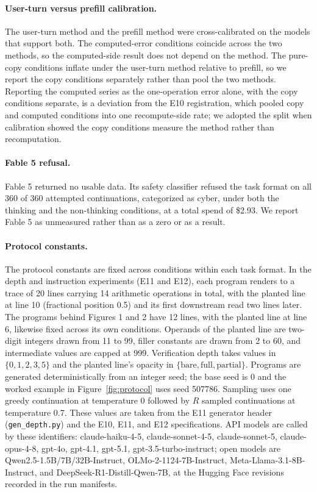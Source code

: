 \paragraph{User-turn versus prefill calibration.}
The user-turn method and the prefill method were cross-calibrated on the models that support both. The computed-error conditions coincide
across the two methods, so the computed-side result does not depend on the method. The pure-copy conditions inflate under the user-turn method relative to prefill, so we report the copy conditions separately rather than pool the two methods. Reporting the computed series as the one-operation error alone, with the copy conditions separate, is a deviation from the E10 registration, which pooled copy and computed conditions into one recompute-side rate; we adopted the split when calibration showed the copy conditions measure the method rather than recomputation.

\paragraph{Fable 5 refusal.}
Fable 5 returned no usable data. Its safety classifier refused the task format
on all 360 of 360 attempted continuations, categorized as cyber, under both the
thinking and the non-thinking conditions, at a total spend of \$2.93. We report
Fable 5 as unmeasured rather than as a zero or as a result.

\paragraph{Protocol constants.}
The protocol constants are fixed across conditions within each task format. In the depth and instruction experiments (E11 and E12), each program renders to a trace of 20 lines carrying 14 arithmetic operations in total, with the planted line at line 10 (fractional position 0.5) and its first downstream read two lines later. The programs behind Figures 1 and 2 have 12 lines, with the planted line at line 6, likewise fixed across its own conditions.
Operands of the planted line are two-digit integers drawn from 11 to 99, filler constants are
drawn from 2 to 60, and intermediate values are capped at 999. Verification
depth takes values in $\{0, 1, 2, 3, 5\}$ and the planted line's opacity in
$\{\text{bare}, \text{full}, \text{partial}\}$. Programs are generated deterministically from an integer seed; the base seed is 0 and the worked
example in Figure~\ref{fig:protocol} uses seed 507786. Sampling uses one greedy continuation at temperature 0 followed by $R$ sampled continuations at temperature 0.7.
These values are taken from the E11 generator header (\texttt{gen\_depth.py})
and the E10, E11, and E12 specifications. API models are called by these identifiers: claude-haiku-4-5, claude-sonnet-4-5, claude-sonnet-5, claude-opus-4-8, gpt-4o, gpt-4.1, gpt-5.1, gpt-3.5-turbo-instruct; open models are Qwen2.5-1.5B/7B/32B-Instruct, OLMo-2-1124-7B-Instruct, Meta-Llama-3.1-8B-Instruct, and DeepSeek-R1-Distill-Qwen-7B, at the Hugging Face revisions recorded in the run manifests.
